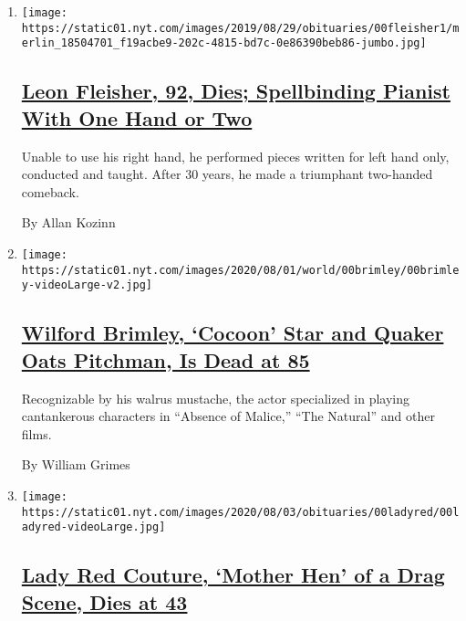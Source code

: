 \begin{enumerate}
\def\labelenumi{\arabic{enumi}.}
\item
  \texttt{[image: https://static01.nyt.com/images/2019/08/29/obituaries/00fleisher1/merlin\_18504701\_f19acbe9-202c-4815-bd7c-0e86390beb86-jumbo.jpg]}

  \hypertarget{leon-fleisher-92-dies-spellbinding-pianist-with-one-hand-or-two}{%
  \subsection{\texorpdfstring{\href{/2020/08/02/arts/music/leon-fleisher-dead.html}{Leon
  Fleisher, 92, Dies; Spellbinding Pianist With One Hand or
  Two}}{Leon Fleisher, 92, Dies; Spellbinding Pianist With One Hand or Two}}\label{leon-fleisher-92-dies-spellbinding-pianist-with-one-hand-or-two}}

  Unable to use his right hand, he performed pieces written for left
  hand only, conducted and taught. After 30 years, he made a triumphant
  two-handed comeback.

  By Allan Kozinn
\item
  \texttt{[image: https://static01.nyt.com/images/2020/08/01/world/00brimley/00brimley-videoLarge-v2.jpg]}

  \hypertarget{wilford-brimley-cocoon-star-and-quaker-oats-pitchman-is-dead-at-85}{%
  \subsection{\texorpdfstring{\href{/2020/08/01/obituaries/wilford-brimley-dead.html}{Wilford
  Brimley, `Cocoon' Star and Quaker Oats Pitchman, Is Dead at
  85}}{Wilford Brimley, `Cocoon' Star and Quaker Oats Pitchman, Is Dead at 85}}\label{wilford-brimley-cocoon-star-and-quaker-oats-pitchman-is-dead-at-85}}

  Recognizable by his walrus mustache, the actor specialized in playing
  cantankerous characters in ``Absence of Malice,'' ``The Natural'' and
  other films.

  By William Grimes
\item
  \texttt{[image: https://static01.nyt.com/images/2020/08/03/obituaries/00ladyred/00ladyred-videoLarge.jpg]}

  \hypertarget{lady-red-couture-mother-hen-of-a-drag-scene-dies-at-43}{%
  \subsection{\texorpdfstring{\href{/2020/08/01/arts/lady-red-couture-dead.html}{Lady
  Red Couture, `Mother Hen' of a Drag Scene, Dies at
  43}}{Lady Red Couture, `Mother Hen' of a Drag Scene, Dies at 43}}\label{lady-red-couture-mother-hen-of-a-drag-scene-dies-at-43}}


\end{enumerate}
